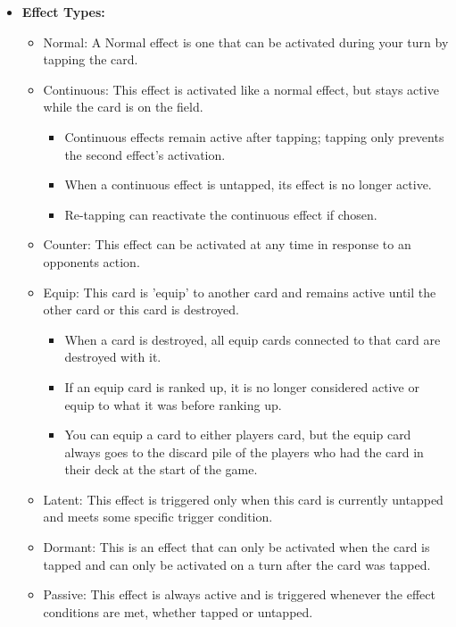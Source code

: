 \begin{itemize}
    \item \textbf{Effect Types:}
    \begin{itemize}
        \item Normal: A Normal effect is one that can be activated during your turn by tapping the card.
        \item Continuous: This effect is activated like a normal effect, but stays active while the card is on the field.
        \begin{itemize}
			\item Continuous effects remain active after tapping; tapping only prevents the second effect’s activation.
			\item When a continuous effect is untapped, its effect is no longer active.
			\item Re-tapping can reactivate the continuous effect if chosen.
        \end{itemize}
		\item Counter: This effect can be activated at any time in response to an opponents action.
		\item Equip: This card is 'equip' to another card and remains active until the other card or this card is destroyed. 
		\begin{itemize}
			\item When a card is destroyed, all equip cards connected to that card are destroyed with it.
			\item If an equip card is ranked up, it is no longer considered active or equip to what it was before ranking up.
			\item You can equip a card to either players card, but the equip card always goes to the discard pile of the players who had the card in their deck at the start of the game.
		\end{itemize}
		\item Latent: This effect is triggered only when this card is currently untapped and meets some specific trigger condition. 
		\item Dormant: This is an effect that can only be activated when the card is tapped and can only be activated on a turn after the card was tapped.
  		\item Passive: This effect is always active and is triggered whenever the effect conditions are met, whether tapped or untapped.
    \end{itemize}
\end{itemize}








